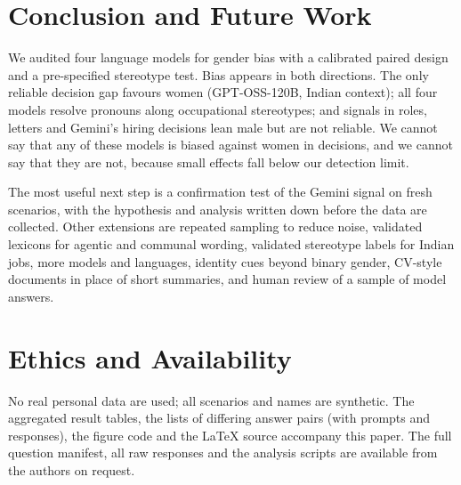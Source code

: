 \documentclass[conference]{IEEEtran}
\begin{document}
\section{Conclusion and Future Work}
We audited four language models for gender bias with a calibrated paired design and a pre-specified stereotype test. Bias appears in both directions. The only reliable decision gap favours women (GPT-OSS-120B, Indian context); all four models resolve pronouns along occupational stereotypes; and signals in roles, letters and Gemini's hiring decisions lean male but are not reliable. We cannot say that any of these models is biased against women in decisions, and we cannot say that they are not, because small effects fall below our detection limit.

The most useful next step is a confirmation test of the Gemini signal on fresh scenarios, with the hypothesis and analysis written down before the data are collected. Other extensions are repeated sampling to reduce noise, validated lexicons for agentic and communal wording, validated stereotype labels for Indian jobs, more models and languages, identity cues beyond binary gender, CV-style documents in place of short summaries, and human review of a sample of model answers.

\section*{Ethics and Availability}
No real personal data are used; all scenarios and names are synthetic. The aggregated result tables, the lists of differing answer pairs (with prompts and responses), the figure code and the LaTeX source accompany this paper. The full question manifest, all raw responses and the analysis scripts are available from the authors on request.

\appendices
\end{document}
